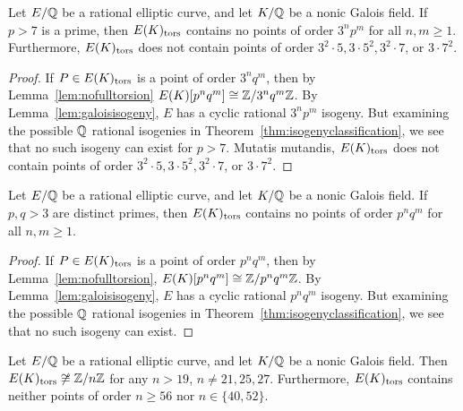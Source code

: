 \begin{lem} \label{3primebound}
Let $E/\mathbb{Q}$ be a rational elliptic curve, and let $K/\mathbb{Q}$ be a nonic Galois field. If $p > 7$ is a prime, then $E(K)_{\text{tors}}$ contains no points of order $3^np^m$ for all $n,m \geq 1$. Furthermore, $E(K)_{\text{tors}}$ does not contain points of order $3^2 \cdot 5, 3 \cdot 5^2, 3^2 \cdot 7$, or $3 \cdot 7^2$. 
\end{lem}

\begin{proof}
If $P \in E(K)_{\text{tors}}$ is a point of order $3^nq^m$, then by Lemma~\ref{lem:nofulltorsion} $E(K)[p^nq^m] \cong \mathbb{Z}/3^nq^m\mathbb{Z}$. By Lemma~\ref{lem:galoisisogeny}, $E$ has a cyclic rational $3^np^m$ isogeny. But examining the possible $\mathbb{Q}$ rational isogenies in Theorem~\ref{thm:isogenyclassification}, we see that no such isogeny can exist for $p > 7$. Mutatis mutandis, $E(K)_{\text{tors}}$ does not contain points of order $3^2 \cdot 5, 3 \cdot 5^2, 3^2 \cdot 7$, or $3 \cdot 7^2$.
\end{proof}


\begin{lem} \label{higherbound}
Let $E/\mathbb{Q}$ be a rational elliptic curve, and let $K/\mathbb{Q}$ be a nonic Galois field. If $p,q > 3$ are distinct primes, then $E(K)_{\text{tors}}$ contains no points of order $p^nq^m$ for all $n,m \geq 1$. 
\end{lem}

\begin{proof}
If $P \in E(K)_{\text{tors}}$ is a point of order $p^nq^m$, then by Lemma~\ref{lem:nofulltorsion}, $E(K)[p^nq^m] \cong \mathbb{Z}/p^nq^m\mathbb{Z}$. By Lemma~\ref{lem:galoisisogeny}, $E$ has a cyclic rational $p^nq^m$ isogeny. But examining the possible $\mathbb{Q}$ rational isogenies in Theorem~\ref{thm:isogenyclassification}, we see that no such isogeny can exist. 
\end{proof}


\begin{lem} \label{finalbound}
Let $E/\mathbb{Q}$ be a rational elliptic curve, and let $K/\mathbb{Q}$ be a nonic Galois field. Then $E(K)_{\text{tors}} \not\cong \mathbb{Z}/n\mathbb{Z}$ for any $n > 19$, $n \neq 21, 25, 27$. Furthermore, $E(K)_{\text{tors}}$ contains neither points of order $n \geq 56$ nor $n \in \{ 40, 52 \}$. 
\end{lem}

